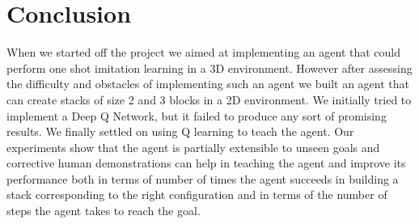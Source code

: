 \documentclass[letterpaper, 12 pt, conference]{ieeeconf}
\begin{document}
\section{Conclusion}
When we started off the project we aimed at implementing an agent that could perform one shot imitation learning in a 3D environment. However after assessing the difficulty and obstacles of implementing such an agent we built an agent that can create stacks of size 2 and 3 blocks in a 2D environment. We initially tried to implement a Deep Q Network, but it failed to produce any sort of promising results. We finally settled on using Q learning to teach the agent. Our experiments show that the agent is partially extensible to unseen goals and corrective human demonstrations can help in teaching the agent and improve its performance both in terms of number of times the agent succeeds in building a stack corresponding to the right configuration and in terms of the number of steps the agent takes to reach the goal.






\end{document}
